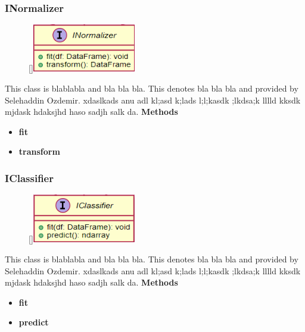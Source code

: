 \subsubsection{INormalizer}
\begin{figure}
    \raisebox{0pt}[\dimexpr{}\baselineskip\relax]{\includegraphics[width=4.5cm]{classes/model-management/10.png}}
\end{figure} 
\par
This class is blablabla and bla bla bla. This denotes bla bla bla and provided by Selehaddin Ozdemir. xdaslkads anu adl kl;asd k;lads l;l;kasdk ;lkdsa;k lllld kksdk mjdask hdaksjhd haso sadjh salk da.
\newline
\newline
\textbf{Methods}
\begin{itemize}
    \item \textbf{fit}
    \item \textbf{transform}
\end{itemize}

\subsubsection{IClassifier}
\begin{figure}
    \raisebox{0pt}[\dimexpr{}\baselineskip\relax]{\includegraphics[width=4.5cm]{classes/model-management/11.png}}
\end{figure} 
\par
This class is blablabla and bla bla bla. This denotes bla bla bla and provided by Selehaddin Ozdemir. xdaslkads anu adl kl;asd k;lads l;l;kasdk ;lkdsa;k lllld kksdk mjdask hdaksjhd haso sadjh salk da.
\newline
\newline
\textbf{Methods}
\begin{itemize}
    \item \textbf{fit}
    \item \textbf{predict}
\end{itemize}

